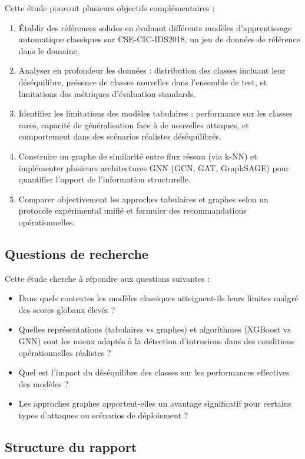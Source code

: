 ﻿\documentclass[11pt,a4paper]{article}
\begin{document}
Cette étude poursuit plusieurs objectifs complémentaires :
\begin{enumerate}
    \item Établir des références solides en évaluant différents modèles d'apprentissage automatique classiques sur CSE-CIC-IDS2018, un jeu de données de référence dans le domaine.
    \item Analyser en profondeur les données : distribution des classes incluant leur déséquilibre, présence de classes nouvelles dans l'ensemble de test, et limitations des métriques d'évaluation standards.
    \item Identifier les limitations des modèles tabulaires : performance sur les classes rares, capacité de généralisation face à de nouvelles attaques, et comportement dans des scénarios réalistes déséquilibrés.
    \item Construire un graphe de similarité entre flux réseau (via k-NN) et implémenter plusieurs architectures GNN (GCN, GAT, GraphSAGE) pour quantifier l'apport de l'information structurelle.
    \item Comparer objectivement les approches tabulaires et graphes selon un protocole expérimental unifié et formuler des recommandations opérationnelles.
\end{enumerate}

\subsection{Questions de recherche}

Cette étude cherche à répondre aux questions suivantes :
\begin{itemize}
    \item Dans quels contextes les modèles classiques atteignent-ils leurs limites malgré des scores globaux élevés ?
    \item Quelles représentations (tabulaires vs graphes) et algorithmes (XGBoost vs GNN) sont les mieux adaptés à la détection d'intrusions dans des conditions opérationnelles réalistes ?
    \item Quel est l'impact du déséquilibre des classes sur les performances effectives des modèles ?
    \item Les approches graphes apportent-elles un avantage significatif pour certains types d'attaques ou scénarios de déploiement ?
\end{itemize}

\subsection{Structure du rapport}
\end{document}
